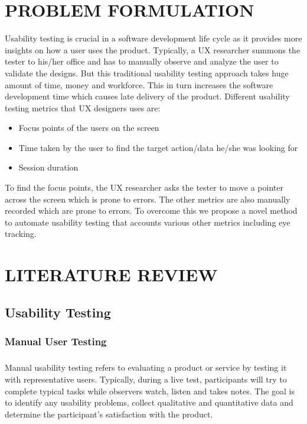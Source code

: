 \documentclass[12pt,a4paper,final]{extreport}
\begin{document}
\chapter{PROBLEM FORMULATION}
\vspace{0.3cm}
Usability testing is crucial in a software development life cycle as it provides more insights
on how a user uses the product. Typically, a UX researcher summons the tester to his/her office
and has to manually observe and analyze the user to validate the designs. But this traditional
usability testing approach takes huge amount of time, money and workforce. This in turn
increases the software development time which causes late delivery of the product. Different
usability testing metrics that UX designers uses are:
\begin{itemize}
    \item Focus points of the users on the screen
    \item Time taken by the user to find the target action/data he/she was looking for
    \item Session duration
\end{itemize}
To find the focus points, the UX researcher asks the tester to move a pointer across the
screen which is prone to errors. The other metrics are also manually recorded which are prone
to errors. To overcome this we propose a novel method to automate usability testing that accounts
various other metrics including eye tracking.


\newpage
\chapter{LITERATURE REVIEW}
\section{Usability Testing}
\subsection{Manual User Testing}
\paragraph{}
Manual usability testing refers to evaluating a product or service by testing it with representative users. Typically, during a live test, participants will try to complete typical tasks while observers watch, listen and takes notes.  The goal is to identify any usability problems, collect qualitative and quantitative data and determine the participant's satisfaction with the product.
\end{document}
